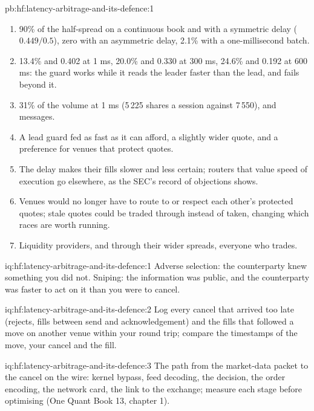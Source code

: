 \begin{solution}{pb:hf:latency-arbitrage-and-its-defence:1}
\begin{enumerate}
principles.
\item 90\% of the half-spread on a continuous book and with a symmetric delay ($0.449/0.5$), zero with an asymmetric delay, 2.1\% with a
one-millisecond batch.
\item 13.4\% and 0.402 at 1 ms, 20.0\% and 0.330 at 300 ms, 24.6\% and 0.192 at 600 ms: the guard works while it reads the leader faster than the
lead, and fails beyond it.
\item 31\% of the volume at 1 ms (5\,225 shares a session against 7\,550), and messages.
\item A lead guard fed as fast as it can afford, a slightly wider quote, and a preference for venues that protect quotes.
\item The delay makes their fills slower and less certain; routers that value speed of execution go elsewhere, as the SEC's record of objections
shows.
\item Venues would no longer have to route to or respect each other's protected quotes; stale quotes could be traded through instead of taken,
changing which races are worth running.
\item Liquidity providers, and through their wider spreads, everyone who trades.
\end{enumerate}
\end{solution}

\begin{solution}{iq:hf:latency-arbitrage-and-its-defence:1}
Adverse selection: the counterparty knew something you did not. Sniping: the information was public, and the counterparty was faster to act on it
than you were to cancel.
\end{solution}

\begin{solution}{iq:hf:latency-arbitrage-and-its-defence:2}
Log every cancel that arrived too late (rejects, fills between send and acknowledgement) and the fills that followed a move on another venue within
your round trip; compare the timestamps of the move, your cancel and the fill.
\end{solution}

\begin{solution}{iq:hf:latency-arbitrage-and-its-defence:3}
The path from the market-data packet to the cancel on the wire: kernel bypass, feed decoding, the decision, the order encoding, the network card, the
link to the exchange; measure each stage before optimising (One Quant Book 13, chapter 1).
\end{solution}

